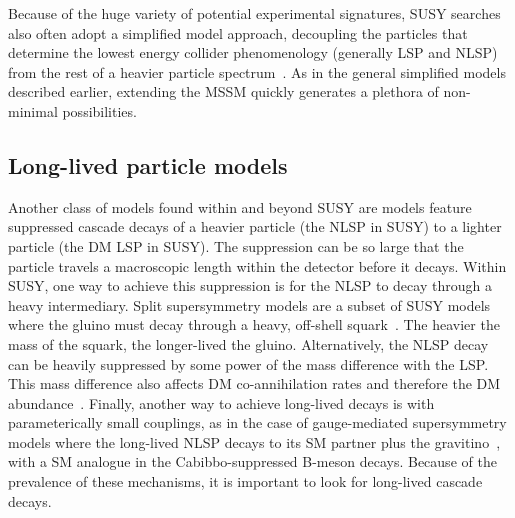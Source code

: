 
Because of the huge variety of potential experimental signatures, SUSY searches also often adopt a simplified model approach, 
decoupling the particles that determine the lowest energy collider phenomenology
(generally LSP and NLSP) from the rest of a heavier particle spectrum~\cite{Alves:2011wf}. 
As in the general simplified models described earlier, extending the MSSM quickly generates a plethora of non-minimal possibilities.

\subsection{Long-lived particle models}
\label{sec:LLPModels}


Another class of models found within and beyond SUSY are models feature suppressed cascade decays of a heavier particle (the NLSP in SUSY) to a lighter particle (the DM LSP in SUSY). The suppression can be so large that the particle travels a macroscopic length within the detector before it decays. Within SUSY, one way to achieve this suppression is for the NLSP to decay through a heavy intermediary. Split supersymmetry models are a subset of SUSY models where the gluino must decay through a heavy, off-shell squark~\cite{Masiero:2004ft}. The heavier the mass of the squark, the longer-lived the gluino. %
Alternatively, the NLSP decay can be heavily suppressed by some power of the mass difference with the LSP. This mass difference also affects DM co-annihilation rates and therefore the DM abundance~\cite{Ellis:1999mm}.
Finally, another way to achieve long-lived decays is with parameterically small couplings, as in the case of gauge-mediated supersymmetry models where the long-lived NLSP decays to its SM partner plus the gravitino~\cite{Dimopoulos:1996vz}, with a SM analogue in the Cabibbo-suppressed B-meson decays.
Because of the prevalence of these mechanisms, it is important to look for long-lived cascade decays.

